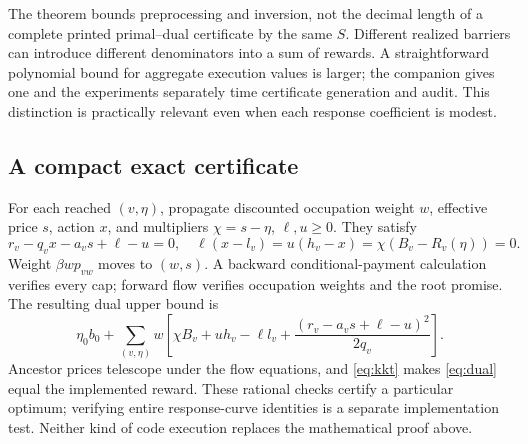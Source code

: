 The theorem bounds preprocessing and inversion, not the decimal length of a complete printed primal--dual certificate by the same $S$. Different realized barriers can introduce different denominators into a sum of rewards. A straightforward polynomial bound for aggregate execution values is larger; the companion gives one and the experiments separately time certificate generation and audit. This distinction is practically relevant even when each response coefficient is modest.

\subsection{A compact exact certificate}\label{sec:certificate}
For each reached $(v,\eta)$, propagate discounted occupation weight $w$, effective price $s$, action $x$, and multipliers $\chi=s-\eta$, $\ell,u\geq0$. They satisfy
\begin{equation}\label{eq:kkt}
 r_v-q_vx-a_vs+\ell-u=0,\quad
 \ell(x-l_v)=u(h_v-x)=\chi(B_v-R_v(\eta))=0.
\end{equation}
Weight $\beta wp_{vw}$ moves to $(w,s)$. A backward conditional-payment calculation verifies every cap; forward flow verifies occupation weights and the root promise. The resulting dual upper bound is
\begin{equation}\label{eq:dual}
 \eta_0b_0+\sum_{(v,\eta)}w\left[
 \chi B_v+u h_v-\ell l_v+
 \frac{(r_v-a_vs+\ell-u)^2}{2q_v}\right].
\end{equation}
Ancestor prices telescope under the flow equations, and \eqref{eq:kkt} makes \eqref{eq:dual} equal the implemented reward. These rational checks certify a particular optimum; verifying entire response-curve identities is a separate implementation test. Neither kind of code execution replaces the mathematical proof above.
